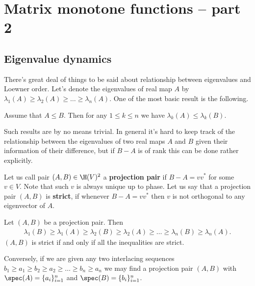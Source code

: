 \chapter{Matrix monotone functions -- part 2}

\section{Eigenvalue dynamics}

There's great deal of things to be said about relationship between eigenvalues and Loewner order. Let's denote the eigenvalues of real map $A$ by $\lambda_{1}(A) \geq \lambda_{2}(A) \geq \ldots \geq \lambda_{n}(A)$. One of the most basic result is the following.

\begin{prop}\label{loewner_eigenvalues}
	Assume that $A \leq B$. Then for any $1 \leq k \leq n$ we have $\lambda_{k}(A) \leq \lambda_{k}(B)$.
\end{prop}

Such results are by no means trivial. In general it's hard to keep track of the relationship between the eigenvalues of two real maps $A$ and $B$ given their information of their difference, but if $B - A$ is of rank this can be done rather explicitly.

\begin{maar}
	Let us call pair $(A, B) \in \H(V)^{2}$ a \textbf{projection pair} if $B - A = v v^{*}$ for some $v \in V$. Note that such $v$ is always unique up to phase. Let us say that a projection pair $(A, B)$ is \textbf{strict}, if whenever $B - A = v v^{*}$ then $v$ is not orthogonal to any eigenvector of $A$. 
\end{maar}

\begin{lem}\label{projection_eigenvalues}
	Let $(A, B)$ be a projection pair. Then
	\begin{align*}
		\lambda_{1}(B) \geq \lambda_{1}(A) \geq \lambda_{2}(B) \geq \lambda_{2}(A) \geq \ldots \geq \lambda_{n}(B) \geq \lambda_{n}(A).
	\end{align*}
	$(A, B)$ is strict if and only if all the inequalities are strict.

	Conversely, if we are given any two interlacing sequences $b_{1} \geq a_{1} \geq b_{2} \geq a_{2} \geq \ldots \geq b_{n} \geq a_{n}$ we may find a projection pair $(A, B)$ with $\spec(A) = \{a_{i}\}_{i = 1}^{n}$ and $\spec(B) = \{b_{i}\}_{i = 1}^{n}$.
\end{lem}

